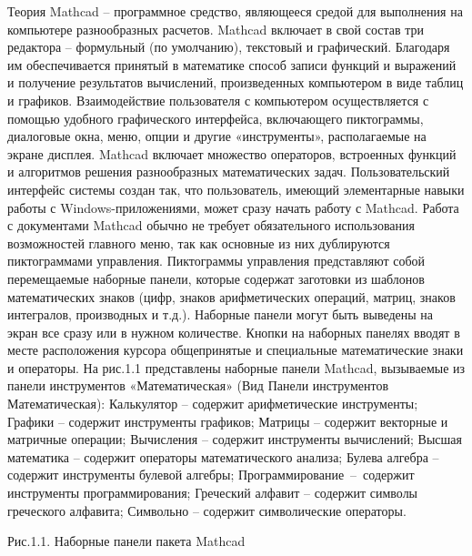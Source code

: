 Теория
Mathcad – программное средство, являющееся средой для выполнения на компьютере разнообразных расчетов. Mathcad включает в свой состав три редактора – формульный (по умолчанию), текстовый и графический. Благодаря им обеспечивается принятый в математике способ записи функций и выражений и получение результатов вычислений, произведенных компьютером в виде таблиц и графиков. Взаимодействие пользователя с компьютером осуществляется с помощью удобного графического интерфейса, включающего пиктограммы, диалоговые окна, меню, опции и другие «инструменты», располагаемые на экране дисплея. Mathcad включает множество операторов, встроенных функций и алгоритмов решения разнообразных математических задач.
Пользовательский интерфейс системы создан так, что пользователь, имеющий элементарные навыки работы с Windows-приложениями, может сразу начать работу с Mathcad. Работа с документами Mathcad обычно не требует обязательного использования возможностей главного меню, так как основные из них дублируются пиктограммами управления. Пиктограммы управления представляют собой перемещаемые наборные панели, которые содержат заготовки из шаблонов математических знаков (цифр, знаков арифметических операций, матриц, знаков интегралов, производных и т.д.). Наборные панели могут быть выведены на экран все сразу или в нужном количестве. Кнопки на наборных панелях вводят в месте расположения курсора общепринятые и специальные математические знаки и операторы. На рис.1.1 представлены наборные панели Mathcad, вызываемые из панели инструментов «Математическая» (Вид  Панели инструментов  Математическая):
Калькулятор – содержит арифметические инструменты;
Графики – содержит инструменты графиков;
Матрицы – содержит векторные и матричные операции;
Вычисления – содержит инструменты вычислений;
Высшая математика – содержит операторы математического анализа;
Булева алгебра – содержит инструменты булевой алгебры;
Программирование – содержит инструменты программирования;
Греческий алфавит – содержит символы греческого алфавита;
Символьно – содержит символические операторы.


Рис.1.1. Наборные панели пакета Mathcad

